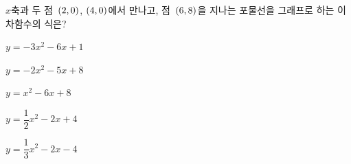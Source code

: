 $x$축과 두 점~$(2{,}\mkern3mu 0)$, $(4{,}\mkern3mu 0)$에서 만나고, 점~$(6{,}\mkern3mu 8)$을 지나는 포물선을 그래프로 하는 이차함수의 식은?
\begin{choicesii}{\rule[-3ex]{0pt}{8ex}$y=-3x^2-6x+1$}{\rule[-3ex]{0pt}{8ex}$y=-2x^2-5x+8$}{\rule[-3ex]{0pt}{8ex}$y=x^2-6x+8$}{\rule[-3ex]{0pt}{8ex}$y=\dfrac{1}{2}x^2-2x+4$}{\rule[-3ex]{0pt}{8ex}$y=\dfrac{1}{3}x^2-2x-4$}\end{choicesii}

